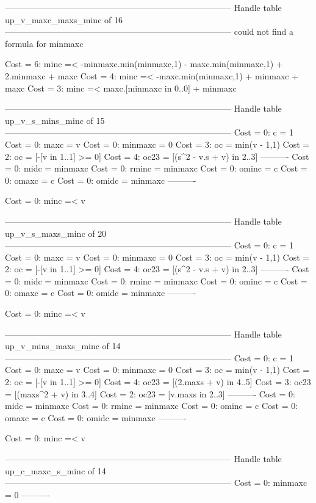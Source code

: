--------------------------------------------------------------------------------
Handle table up_v_maxc_maxs_minc of 16
--------------------------------------------------------------------------------
could not find a formula for minmaxc

Cost =  6:  minc =< -minmaxc.min(minmaxc,1) - maxc.min(minmaxc,1) + 2.minmaxc + maxc
Cost =  4:  minc =< -maxc.min(minmaxc,1) + minmaxc + maxc
Cost =  3:  minc =< maxc.[minmaxc in 0..0] + minmaxc

--------------------------------------------------------------------------------
Handle table up_v_s_mins_minc of 15
--------------------------------------------------------------------------------
Cost =  0:  c       = 1
Cost =  0:  maxc    = v
Cost =  0:  minmaxc = 0
Cost =  3:  oc      = min(v - 1,1)
Cost =  2:  oc      = [-[v in 1..1] >= 0]
Cost =  4:  oc23    = [(s^2 - v.s + v) in 2..3]
----------
Cost =  0:  midc    = minmaxc
Cost =  0:  rminc   = minmaxc
Cost =  0:  ominc   = c
Cost =  0:  omaxc   = c
Cost =  0:  omidc   = minmaxc
----------

Cost =  0:  minc =< v

--------------------------------------------------------------------------------
Handle table up_v_s_maxs_minc of 20
--------------------------------------------------------------------------------
Cost =  0:  c       = 1
Cost =  0:  maxc    = v
Cost =  0:  minmaxc = 0
Cost =  3:  oc      = min(v - 1,1)
Cost =  2:  oc      = [-[v in 1..1] >= 0]
Cost =  4:  oc23    = [(s^2 - v.s + v) in 2..3]
----------
Cost =  0:  midc    = minmaxc
Cost =  0:  rminc   = minmaxc
Cost =  0:  ominc   = c
Cost =  0:  omaxc   = c
Cost =  0:  omidc   = minmaxc
----------

Cost =  0:  minc =< v

--------------------------------------------------------------------------------
Handle table up_v_mins_maxs_minc of 14
--------------------------------------------------------------------------------
Cost =  0:  c       = 1
Cost =  0:  maxc    = v
Cost =  0:  minmaxc = 0
Cost =  3:  oc      = min(v - 1,1)
Cost =  2:  oc      = [-[v in 1..1] >= 0]
Cost =  4:  oc23    = [(2.maxs + v) in 4..5]
Cost =  3:  oc23    = [(maxs^2 + v) in 3..4]
Cost =  2:  oc23    = [v.maxs in 2..3]
----------
Cost =  0:  midc    = minmaxc
Cost =  0:  rminc   = minmaxc
Cost =  0:  ominc   = c
Cost =  0:  omaxc   = c
Cost =  0:  omidc   = minmaxc
----------

Cost =  0:  minc =< v

--------------------------------------------------------------------------------
Handle table up_c_maxc_s_minc of 14
--------------------------------------------------------------------------------
Cost =  0:  minmaxc = 0
----------

